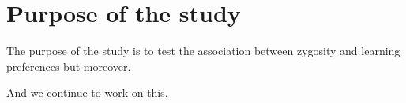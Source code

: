 \section{Purpose of the study}\label{purpose-of-the-study}

The purpose of the study is to test the association between zygosity and
learning preferences \cite{HillGoldsmith:1991uf} but moreover.

\hypertarget{refs}{}
And we continue to work on this. 